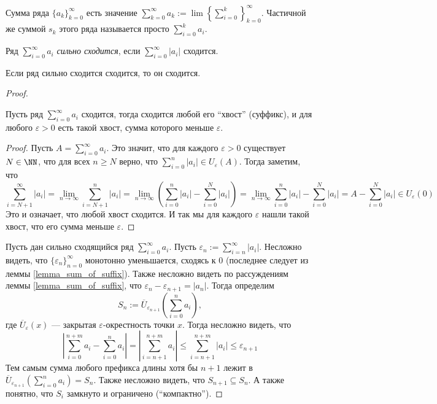 \documentclass[12pt,a4paper]{article}
\begin{document}
    \begin{definition}
        Сумма ряда $\{a_k\}_{k=0}^\infty$ есть значение $\sum_{k=0}^\infty a_k := \lim \left\{\sum_{i=0}^k\right\}_{k=0}^\infty$. Частичной же суммой $s_k$ этого ряда называется просто $\sum_{i=0}^k a_i$.
    \end{definition}

    \begin{definition}
        Ряд $\sum_{i=0}^\infty a_i$ \emph{сильно сходится}, если $\sum_{i=0}^\infty |a_i|$ сходится.
    \end{definition}

    \begin{theorem}
        Если ряд сильно сходится сходится, то он сходится.
    \end{theorem}

    \begin{proof}
        \begin{thlemma}\label{lemma_sum_of_suffix}
            Пусть ряд $\sum_{i=0}^\infty a_i$ сходится, тогда сходится любой его ``хвост'' (суффикс), и для любого $\varepsilon > 0$ есть такой хвост, сумма которого меньше $\varepsilon$.
        \end{thlemma}

        \begin{proof}
            Пусть $A = \sum_{i=0}^\infty a_i$. Это значит, что для каждого $\varepsilon > 0$ существует $N \in \NN$, что для всех $n \geqslant N$ верно, что $\sum_{i=0}^n |a_i| \in U_\varepsilon(A)$. Тогда заметим, что
            \[\sum_{i=N+1}^\infty |a_i| = \lim_{n \to \infty} \sum_{i=N+1}^n |a_i| = \lim_{n \to \infty} \left(\sum_{i=0}^n |a_i| - \sum_{i=0}^N |a_i|\right) = \lim_{n \to \infty} \sum_{i=0}^n |a_i| - \sum_{i=0}^N |a_i| = A - \sum_{i=0}^N |a_i| \in U_\varepsilon(0)\]
            Это и означает, что любой хвост сходится. И так мы для каждого $\varepsilon$ нашли такой хвост, что его сумма меньше $\varepsilon$.
        \end{proof}

        Пусть дан сильно сходящийся ряд $\sum_{i=0}^\infty a_i$. Пусть $\varepsilon_n := \sum_{i=n}^\infty |a_i|$. Несложно видеть, что $\{\varepsilon_n\}_{n=0}^\infty$ монотонно уменьшается, сходясь к 0 (последнее следует из леммы \ref{lemma_sum_of_suffix}). Также несложно видеть по рассуждениям леммы \ref{lemma_sum_of_suffix}, что $\varepsilon_n - \varepsilon_{n+1} = |a_n|$. Тогда определим
        \[S_n := \overline{U}_{\varepsilon_{n+1}}(\sum_{i=0}^n a_i),\]
        где $\overline{U}_\varepsilon(x)$ --- закрытая $\varepsilon$-окрестность точки $x$. Тогда несложно видеть, что
        \[\left|\sum_{i=0}^{n+m} a_i - \sum_{i=0}^{n} a_i \right| = \left|\sum_{i=n+1}^{n+m} a_i \right| \leqslant \sum_{i=n+1}^{n+m} |a_i| \leqslant \varepsilon_{n+1}\]
        Тем самым сумма любого префикса длины хотя бы $n+1$ лежит в $\overline{U}_{\varepsilon_{n+1}}(\sum_{i=0}^{n} a_i) = S_n$. Также несложно видеть, что $S_{n+1} \subseteq S_n$. А также понятно, что $S_i$ замкнуто и ограничено (``компактно'').


\end{proof}
\end{document}
